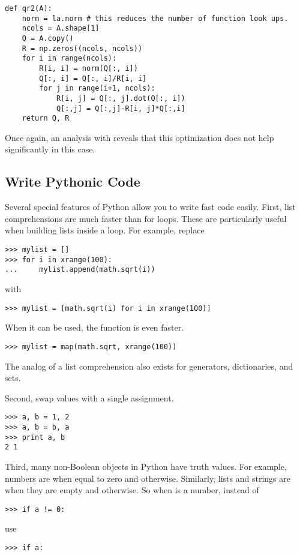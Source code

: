 \begin{lstlisting}
def qr2(A):
    norm = la.norm # this reduces the number of function look ups.
    ncols = A.shape[1]
    Q = A.copy()
    R = np.zeros((ncols, ncols))
    for i in range(ncols):
        R[i, i] = norm(Q[:, i])
        Q[:, i] = Q[:, i]/R[i, i]
        for j in range(i+1, ncols):
            R[i, j] = Q[:, j].dot(Q[:, i])
            Q[:,j] = Q[:,j]-R[i, j]*Q[:,i]
    return Q, R
\end{lstlisting}
Once again, an analysis with  reveals that this optimization does not help significantly in this case.


\subsection*{Write Pythonic Code}
Several special features of Python allow you to write fast code easily.
First, list comprehensions are much faster than for loops. These are particularly useful when building lists inside a loop.
For example, replace
\begin{lstlisting}
>>> mylist = []
>>> for i in xrange(100):
...     mylist.append(math.sqrt(i))
\end{lstlisting}
with
\begin{lstlisting}
>>> mylist = [math.sqrt(i) for i in xrange(100)]
\end{lstlisting}
When it can be used, the function  is even faster.
\begin{lstlisting}
>>> mylist = map(math.sqrt, xrange(100))
\end{lstlisting}
The analog of a list comprehension also exists for generators, dictionaries, and sets.

Second, swap values with a single assignment.
\begin{lstlisting}
>>> a, b = 1, 2
>>> a, b = b, a
>>> print a, b
2 1
\end{lstlisting}

Third, many non-Boolean objects in Python have truth values.
For example, numbers are  when equal to zero and  otherwise.
Similarly, lists and strings are  when they are empty and  otherwise.
So when  is a number, instead of
\begin{lstlisting}
>>> if a != 0:
\end{lstlisting}
use
\begin{lstlisting}
>>> if a:
\end{lstlisting}

